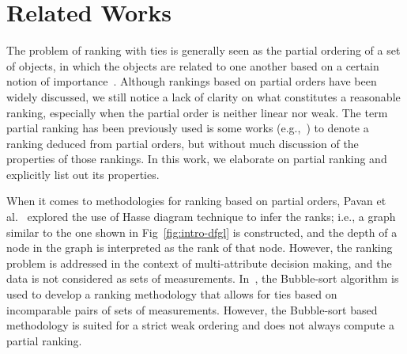 \documentclass[acmsmall,screen, review]{acmart}
\newcommand{\acc}[1]{{\color{red}#1}}
\begin{document}
\section{Related Works}
\label{sec3:rel}




The problem of ranking with ties is generally seen as the partial ordering of a set of objects, in which the objects are related to one another based on a certain notion of importance~\cite{bruggemann2011ranking, janicki2008ranking}.
Although rankings based on partial orders have been widely discussed, we still notice a lack of clarity on what constitutes a reasonable ranking, especially when the partial order is neither linear nor weak. The term partial ranking has been previously used is some works (e.g.,~\cite{fagin2006comparing,ailon2010aggregation, pavan2004new}) to denote a ranking deduced from partial orders, but without much discussion of the properties of those rankings. In this work, we elaborate on partial ranking and explicitly list out its properties.

When it comes to methodologies for ranking based on partial orders, Pavan et al.~\cite{pavan2004new} explored the use of Hasse diagram technique to infer the ranks; i.e., a graph similar to the one shown in Fig~\ref{fig:intro-dfgl} is constructed, and the depth of a node in the graph is interpreted as the rank of that node. However, the ranking problem is addressed in the context of multi-attribute decision making, and the data is not considered as sets of measurements.  In~\cite{sankaran2022test, sankaran2021performance}, the Bubble-sort algorithm is used to develop a ranking methodology that allows for ties based on incomparable pairs of sets of measurements. However, the Bubble-sort based methodology is suited for a strict weak ordering and does not always compute a partial ranking. 
\end{document}
